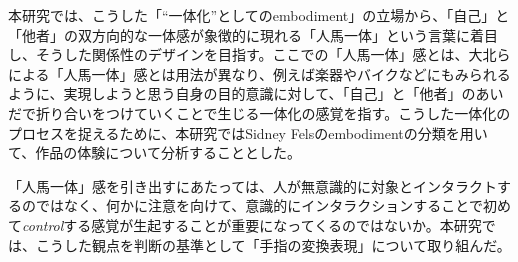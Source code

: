 

本研究では、こうした「``一体化''としてのembodiment」の立場から、「自己」と「他者」の双方向的な一体感が象徴的に現れる「人馬一体」という言葉に着目し、そうした関係性のデザインを目指す。ここでの「人馬一体」感とは、大北らによる「人馬一体」感とは用法が異なり、例えば楽器やバイクなどにもみられるように、実現しようと思う自身の目的意識に対して、「自己」と「他者」のあいだで折り合いをつけていくことで生じる一体化の感覚を指す。こうした一体化のプロセスを捉えるために、本研究ではSidney Felsのembodimentの分類を用いて、作品の体験について分析することとした。

「人馬一体」感を引き出すにあたっては、人が無意識的に対象とインタラクトするのではなく、何かに注意を向けて、意識的にインタラクションすることで初めて\textit{control}する感覚が生起することが重要になってくるのではないか。本研究では、こうした観点を判断の基準として「手指の変換表現」について取り組んだ。



